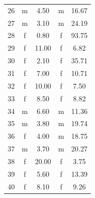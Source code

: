 \documentclass[11pt]{article}
\begin{document}
\begin{table}[htbp]
{\begin{tabular}{lcccc}
26 & m & 4.50  & m & 16.67 \\
27 & m & 3.10  & m & 24.19 \\
28 & f & 0.80  & f & 93.75 \\
29 & f & 11.00 & f & 6.82 \\
30 & f & 2.10  & f & 35.71 \\
31 & f & 7.00  & f & 10.71 \\
32 & f & 10.00 & f & 7.50 \\
33 & f & 8.50  & f & 8.82 \\
34 & m & 6.60  & m & 11.36 \\
35 & m & 3.80  & m & 19.74 \\
36 & f & 4.00  & m & 18.75 \\
37 & m & 3.70  & m & 20.27 \\
38 & f & 20.00 & f & 3.75 \\
39 & f & 5.60  & f & 13.39 \\
40 & f & 8.10  & f & 9.26 \\
\hline
\end{tabular}
}
\end{table}
\end{document}
